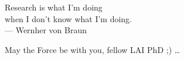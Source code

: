 \documentclass[../main.tex]{subfiles}
\begin{document}
\cleardoublepage
\thispagestyle{empty}


\vspace*{3cm}

\begin{raggedleft}
    Research is what I'm doing\\ 
    when I don't know what I'm doing.\\
     --- Wernher von Braun\\
\end{raggedleft}

\vspace{4cm}

\begin{center}
    May the Force be with you, fellow LAI PhD ;) \dots
\end{center}
\end{document}
